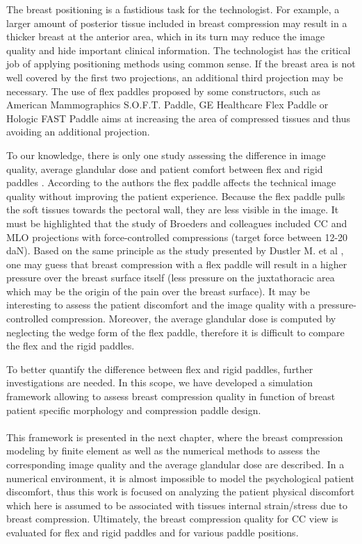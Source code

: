 The breast positioning is a fastidious task for the technologist. For example, a larger amount of posterior tissue included in breast compression may result in a thicker breast at the anterior area, which in its turn may reduce the image quality and hide important clinical information. The technologist has the critical job of applying positioning methods using common sense. If the breast area is not well covered by the first two projections, an additional third projection may be necessary. The use of flex paddles proposed by some constructors, such as American Mammographics S.O.F.T. Paddle, GE Healthcare Flex Paddle or Hologic FAST Paddle aims at increasing the area of compressed tissues and thus avoiding an additional projection.

To our knowledge, there is only one study assessing the difference in image quality, average glandular dose and patient comfort between flex and rigid paddles \citep{broeders_comparison_2015}. According to the authors the flex paddle affects the technical image quality without improving the patient experience.  Because the flex paddle pulls the soft tissues towards the pectoral wall, they are less visible in the image. It must be highlighted that the study of Broeders and colleagues included CC and MLO projections with force-controlled compressions (target force between 12-20 daN). Based on the same principle as the study presented by Dustler M. et al \cite{dustler_effect_2012}, one may guess that breast compression with a flex paddle will result in a higher pressure over the breast surface itself (less pressure on the juxtathoracic area which may be the origin of the pain over the breast surface). It may be interesting to assess the patient discomfort and the image quality with a pressure-controlled compression. Moreover, the average glandular dose is computed by neglecting the wedge form of the flex paddle, therefore it is difficult to compare the flex and the rigid paddles.  

To better quantify the difference between flex and rigid paddles, further investigations are needed.  In this scope, we have developed a simulation framework allowing to assess breast compression quality in function of breast patient specific morphology and compression paddle design.\\
\\


This framework is presented in the next chapter, where the breast compression modeling by finite element as well as the numerical methods to assess the corresponding image quality and the average glandular dose are described. In a numerical environment, it is almost impossible to model the psychological patient discomfort, thus this work is focused on analyzing the patient physical discomfort which here is assumed to be associated with tissues internal strain/stress due to breast compression. Ultimately, the breast compression quality for CC view is evaluated for flex and rigid paddles and for various paddle positions.
